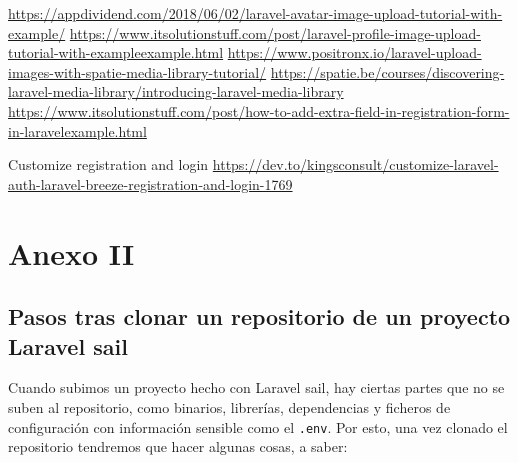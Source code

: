 \documentclass[11pt]{article}
\begin{document}
\url{https://appdividend.com/2018/06/02/laravel-avatar-image-upload-tutorial-with-example/}
\url{https://www.itsolutionstuff.com/post/laravel-profile-image-upload-tutorial-with-exampleexample.html}
\url{https://www.positronx.io/laravel-upload-images-with-spatie-media-library-tutorial/}
\url{https://spatie.be/courses/discovering-laravel-media-library/introducing-laravel-media-library}
\url{https://www.itsolutionstuff.com/post/how-to-add-extra-field-in-registration-form-in-laravelexample.html}

Customize registration and login
\url{https://dev.to/kingsconsult/customize-laravel-auth-laravel-breeze-registration-and-login-1769}


\newpage


\section{Anexo II}
\label{sec:orgcdc2eb4}
\subsection{Pasos tras clonar un repositorio de un proyecto Laravel sail}
\label{sec:orgf9464c3}
Cuando subimos un proyecto hecho con Laravel sail, hay ciertas partes
que no se suben al repositorio, como binarios, librerías, dependencias
y ficheros de configuración con información sensible como el
\texttt{.env}. Por esto, una vez clonado el repositorio tendremos que hacer
algunas cosas, a saber:
\end{document}
